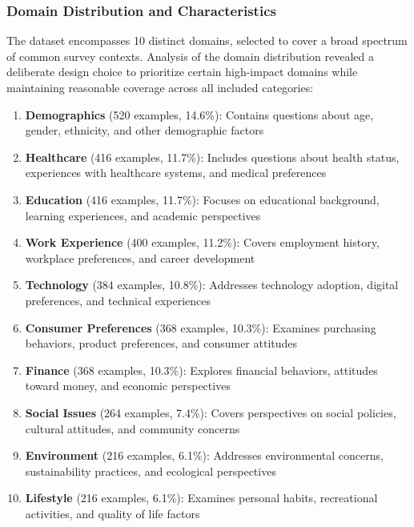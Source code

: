 \documentclass[11pt]{article}
\begin{document}
\subsubsection{Domain Distribution and Characteristics}
The dataset encompasses 10 distinct domains, selected to cover a broad spectrum of common survey contexts. Analysis of the domain distribution revealed a deliberate design choice to prioritize certain high-impact domains while maintaining reasonable coverage across all included categories:
\begin{enumerate}
    \item \textbf{Demographics} (520 examples, 14.6\%): Contains questions about age, gender, ethnicity, and other demographic factors
    \item \textbf{Healthcare} (416 examples, 11.7\%): Includes questions about health status, experiences with healthcare systems, and medical preferences
    \item \textbf{Education} (416 examples, 11.7\%): Focuses on educational background, learning experiences, and academic perspectives
    \item \textbf{Work Experience} (400 examples, 11.2\%): Covers employment history, workplace preferences, and career development
    \item \textbf{Technology} (384 examples, 10.8\%): Addresses technology adoption, digital preferences, and technical experiences
    \item \textbf{Consumer Preferences} (368 examples, 10.3\%): Examines purchasing behaviors, product preferences, and consumer attitudes
    \item \textbf{Finance} (368 examples, 10.3\%): Explores financial behaviors, attitudes toward money, and economic perspectives
    \item \textbf{Social Issues} (264 examples, 7.4\%): Covers perspectives on social policies, cultural attitudes, and community concerns
    \item \textbf{Environment} (216 examples, 6.1\%): Addresses environmental concerns, sustainability practices, and ecological perspectives
    \item \textbf{Lifestyle} (216 examples, 6.1\%): Examines personal habits, recreational activities, and quality of life factors
\end{enumerate}
\end{document}
